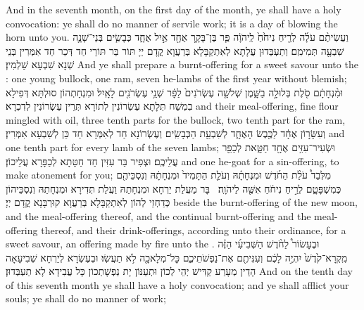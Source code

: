 {And in the seventh month, on the first day of the month, ye shall have a holy convocation: ye shall do no manner of servile work; it is a day of blowing the horn unto you.}{}
{וַעֲשִׂיתֶ֨ם עֹלָ֜ה לְרֵ֤יחַ נִיחֹ֙חַ֙ לַֽיהֹוָ֔ה פַּ֧ר בֶּן־בָּקָ֛ר אֶחָ֖ד אַ֣יִל אֶחָ֑ד כְּבָשִׂ֧ים בְּנֵי־שָׁנָ֛ה שִׁבְעָ֖ה תְּמִימִֽם׃}
{וְתַעְבְּדוּן עֲלָתָא לְאִתְקַבָּלָא בְּרַעֲוָא קֳדָם יְיָ תּוֹר בַּר תּוֹרֵי חַד דְּכַר חַד אִמְּרִין בְּנֵי שְׁנָא שִׁבְעָא שַׁלְמִין׃}
{And ye shall prepare a burnt-offering for a sweet savour unto the \lord: one young bullock, one ram, seven he-lambs of the first year without blemish;}{}
{וּמִ֨נְחָתָ֔ם סֹ֖לֶת בְּלוּלָ֣ה בַשָּׁ֑מֶן שְׁלֹשָׁ֤ה עֶשְׂרֹנִים֙ לַפָּ֔ר שְׁנֵ֥י עֶשְׂרֹנִ֖ים לָאָֽיִל׃}
{וּמִנְחָתְהוֹן סוּלְתָּא דְּפִילָא בִמְשַׁח תְּלָתָא עֶשְׂרוֹנִין לְתוֹרָא תְּרֵין עֶשְׂרוֹנִין לְדִכְרָא׃}
{and their meal-offering, fine flour mingled with oil, three tenth parts for the bullock, two tenth part for the ram,}{}
{וְעִשָּׂר֣וֹן אֶחָ֔ד לַכֶּ֖בֶשׂ הָאֶחָ֑ד לְשִׁבְעַ֖ת הַכְּבָשִֽׂים׃}
{וְעֶשְׂרוֹנָא חַד לְאִמְּרָא חַד כֵּן לְשִׁבְעָא אִמְּרִין׃}
{and one tenth part for every lamb of the seven lambs;}{}
{וּשְׂעִיר־עִזִּ֥ים אֶחָ֖ד חַטָּ֑את לְכַפֵּ֖ר עֲלֵיכֶֽם׃}
{וּצְפִיר בַּר עִזִּין חַד חַטָּתָא לְכַפָּרָא עֲלֵיכוֹן׃}
{and one he-goat for a sin-offering, to make atonement for you;}{}
{מִלְּבַד֩ עֹלַ֨ת הַחֹ֜דֶשׁ וּמִנְחָתָ֗הּ וְעֹלַ֤ת הַתָּמִיד֙ וּמִנְחָתָ֔הּ וְנִסְכֵּיהֶ֖ם כְּמִשְׁפָּטָ֑ם לְרֵ֣יחַ נִיחֹ֔חַ אִשֶּׁ֖ה לַיהֹוָֽה׃ \setuma 
{}}
{בָּר מֵעֲלַת יַרְחָא וּמִנְחָתַהּ וַעֲלַת תְּדִירָא וּמִנְחָתַהּ וְנִסְכֵּיהוֹן כְּדַחְזֵי לְהוֹן לְאִתְקַבָּלָא בְּרַעֲוָא קוּרְבָּנָא קֳדָם יְיָ׃}
{beside the burnt-offering of the new moon, and the meal-offering thereof, and the continual burnt-offering and the meal-offering thereof, and their drink-offerings, according unto their ordinance, for a sweet savour, an offering made by fire unto the \lord.}{}
{וּבֶעָשׂוֹר֩ לַחֹ֨דֶשׁ הַשְּׁבִיעִ֜י הַזֶּ֗ה מִֽקְרָא־קֹ֙דֶשׁ֙ יִהְיֶ֣ה לָכֶ֔ם וְעִנִּיתֶ֖ם אֶת־נַפְשֹׁתֵיכֶ֑ם כׇּל־מְלָאכָ֖ה לֹ֥א תַעֲשֽׂוּ׃}
{וּבְעֶשְׂרָא לְיַרְחָא שְׁבִיעָאָה הָדֵין מְעָרַע קַדִּישׁ יְהֵי לְכוֹן וּתְעַנּוֹן יָת נַפְשָׁתְכוֹן כָּל עֲבִידָא לָא תַעְבְּדוּן׃}
{And on the tenth day of this seventh month ye shall have a holy convocation; and ye shall afflict your souls; ye shall do no manner of work;}{}

